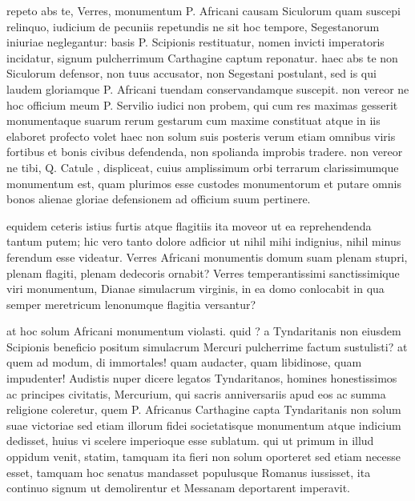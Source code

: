  repeto abs te, Verres, monumentum P. Africani causam Siculorum quam suscepi relinquo, iudicium de pecuniis repetundis ne sit hoc tempore, Segestanorum iniuriae neglegantur: basis P. Scipionis restituatur, nomen invicti imperatoris incidatur, signum pulcherrimum Carthagine captum reponatur. haec abs te non Siculorum defensor, non tuus accusator, non Segestani postulant, sed is qui laudem gloriamque P. Africani tuendam conservandamque suscepit. non vereor ne hoc officium meum P. Servilio iudici non probem, qui cum res maximas gesserit monumentaque suarum rerum gestarum cum maxime constituat atque in iis elaboret profecto volet haec non solum suis posteris verum etiam omnibus viris fortibus et bonis civibus defendenda, non spolianda improbis tradere. non vereor ne tibi, Q. Catule , displiceat, cuius amplissimum orbi terrarum clarissimumque monumentum est, quam plurimos esse custodes monumentorum et putare omnis bonos alienae gloriae defensionem ad officium suum pertinere.

 equidem ceteris istius furtis atque flagitiis ita moveor ut ea reprehendenda tantum putem; hic vero tanto dolore adficior ut nihil mihi indignius, nihil minus ferendum esse videatur. Verres Africani monumentis domum suam plenam stupri, plenam flagiti, plenam dedecoris ornabit? Verres temperantissimi sanctissimique viri monumentum, Dianae simulacrum virginis, in ea domo conlocabit in qua semper meretricum lenonumque flagitia versantur?

 at hoc solum Africani monumentum violasti. quid ? a Tyndaritanis non eiusdem Scipionis beneficio positum simulacrum Mercuri pulcherrime factum sustulisti? at quem ad modum, di immortales! quam audacter, quam libidinose, quam impudenter! Audistis nuper dicere legatos Tyndaritanos, homines honestissimos ac principes civitatis, Mercurium, qui sacris anniversariis apud eos ac summa religione coleretur, quem P. Africanus Carthagine capta Tyndaritanis non solum suae victoriae sed etiam illorum fidei societatisque monumentum atque indicium dedisset, huius vi scelere imperioque esse sublatum. qui ut primum in illud oppidum venit, statim, tamquam ita fieri non solum oporteret sed etiam necesse esset, tamquam hoc senatus mandasset populusque Romanus iussisset, ita continuo signum ut demolirentur et Messanam deportarent imperavit.

